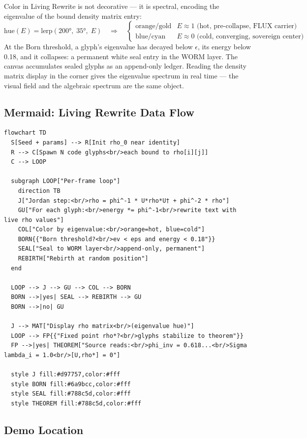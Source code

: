 \documentclass[12pt, letterpaper]{article}
\theoremstyle{plain}
\theoremstyle{definition}
\theoremstyle{remark}
\begin{document}
Color in Living Rewrite is not decorative --- it is spectral, encoding the
eigenvalue of the bound density matrix entry:
\[
  \text{hue}(E) = \text{lerp}(200°,\; 35°,\; E)
  \quad\Longrightarrow\quad
  \begin{cases}
    \text{orange/gold} & E \approx 1 \text{ (hot, pre-collapse, FLUX carrier)} \\
    \text{blue/cyan} & E \approx 0 \text{ (cold, converging, sovereign center)}
  \end{cases}
\]
At the Born threshold, a glyph's eigenvalue has decayed below $\epsilon$,
its energy below 0.18, and it collapses: a permanent white seal entry in the
WORM layer. The canvas accumulates sealed glyphs as an append-only ledger.
Reading the density matrix display in the corner gives the eigenvalue spectrum
in real time --- the visual field and the algebraic spectrum are the same object.

\subsection{Mermaid: Living Rewrite Data Flow}

\begin{verbatim}
flowchart TD
  S[Seed + params] --> R[Init rho_0 near identity]
  R --> C[Spawn N code glyphs<br/>each bound to rho[i][j]]
  C --> LOOP

  subgraph LOOP["Per-frame loop"]
    direction TB
    J["Jordan step:<br/>rho = phi^-1 * U*rho*U† + phi^-2 * rho"]
    GU["For each glyph:<br/>energy *= phi^-1<br/>rewrite text with live rho values"]
    COL["Color by eigenvalue:<br/>orange=hot, blue=cold"]
    BORN{{"Born threshold?<br/>ev < eps and energy < 0.18"}}
    SEAL["Seal to WORM layer<br/>append-only, permanent"]
    REBIRTH["Rebirth at random position"]
  end

  LOOP --> J --> GU --> COL --> BORN
  BORN -->|yes| SEAL --> REBIRTH --> GU
  BORN -->|no| GU

  J --> MAT["Display rho matrix<br/>(eigenvalue hue)"]
  LOOP --> FP{{"Fixed point rho*?<br/>glyphs stabilize to theorem"}}
  FP -->|yes| THEOREM["Source reads:<br/>phi_inv = 0.618...<br/>Sigma lambda_i = 1.0<br/>[U,rho*] = 0"]

  style J fill:#d97757,color:#fff
  style BORN fill:#6a9bcc,color:#fff
  style SEAL fill:#788c5d,color:#fff
  style THEOREM fill:#788c5d,color:#fff
\end{verbatim}

\subsection{Demo Location}
\end{document}
